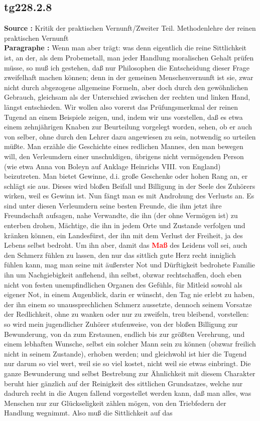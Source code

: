 \documentclass[a4paper,12pt,twoside]{book}
\newcommand{\match}[1]{\textcolor{red}{\textbf{#1}}}
\begin{document}
	\subsection*{tg228.2.8} 
	\textbf{Source : }Kritik der praktischen Vernunft/Zweiter Teil. Methodenlehre der reinen praktischen Vernunft\\  
	
	\noindent\textbf{Paragraphe : }
	Wenn man aber trägt: was denn eigentlich die reine Sittlichkeit ist, an der, als dem Probemetall, man jeder Handlung moralischen Gehalt prüfen müsse, so muß ich gestehen, daß nur Philosophen die Entscheidung dieser Frage zweifelhaft machen können; denn in der gemeinen Menschenvernunft ist sie, zwar nicht durch abgezogene allgemeine Formeln, aber doch durch den gewöhnlichen Gebrauch, gleichsam als der Unterschied zwischen der rechten und linken Hand, längst entschieden. Wir wollen also vorerst das Prüfungsmerkmal der reinen Tugend an einem Beispiele zeigen, und, indem wir uns vorstellen, daß es etwa einem zehnjährigen Knaben zur Beurteilung vorgelegt worden, sehen, ob er auch von selber, ohne durch den Lehrer dazu angewiesen zu sein, notwendig so urteilen müßte. Man erzähle die Geschichte eines redlichen Mannes, den man bewegen will, den Verleumdern einer unschuldigen, übrigens nicht vermögenden Person (wie etwa Anna von Boleyn auf Anklage Heinrichs VIII. von England) beizutreten. Man bietet Gewinne, d.i. große Geschenke oder hohen Rang an, er schlägt sie aus. Dieses wird bloßen Beifall und Billigung in der Seele des Zuhörers wirken, weil es Gewinn ist. Nun fängt man es mit Androhung des Verlusts an. Es sind unter diesen Verleumdern seine besten Freunde, die ihm jetzt ihre Freundschaft aufsagen, nahe Verwandte, die ihn (der ohne Vermögen ist) zu enterben drohen, Mächtige, die ihn in jedem Orte und Zustande verfolgen und kränken können, ein Landesfürst, der ihn mit dem Verlust der Freiheit, ja des Lebens selbst bedroht. Um ihn aber, damit das \match{Maß} des Leidens voll sei, auch den Schmerz fühlen zu lassen, den nur  das sittlich gute Herz recht inniglich fühlen kann, mag man seine mit äußerster Not und Dürftigkeit bedrohete Familie ihn um Nachgiebigkeit anflehend, ihn selbst, obzwar rechtschaffen, doch eben nicht von festen unempfindlichen Organen des Gefühls, für Mitleid sowohl als eigener Not, in einem Augenblick, darin er wünscht, den Tag nie erlebt zu haben, der ihn einem so unaussprechlichen Schmerz aussetzte, dennoch seinem Vorsatze der Redlichkeit, ohne zu wanken oder nur zu zweifeln, treu bleibend, vorstellen: so wird mein jugendlicher Zuhörer stufenweise, von der bloßen Billigung zur Bewunderung, von da zum Erstaunen, endlich bis zur größten Verehrung, und einem lebhaften Wunsche, selbst ein solcher Mann sein zu können (obzwar freilich nicht in seinem Zustande), erhoben werden; und gleichwohl ist hier die Tugend nur darum so viel wert, weil sie so viel kostet, nicht weil sie etwas einbringt. Die ganze Bewunderung und selbst Bestrebung zur Ähnlichkeit mit diesem Charakter beruht hier gänzlich auf der Reinigkeit des sittlichen Grundsatzes, welche nur dadurch recht in die Augen fallend vorgestellet werden kann, daß man alles, was Menschen nur zur Glückseligkeit zählen mögen, von den Triebfedern der Handlung wegnimmt. Also muß die Sittlichkeit auf das 
\end{document}
